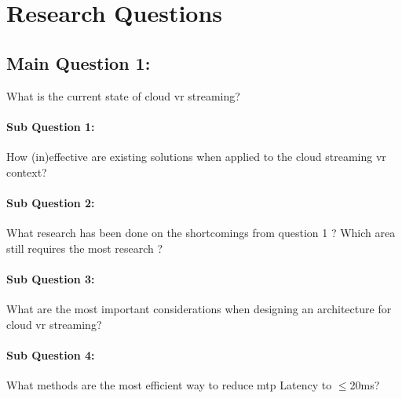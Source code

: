 \section{Research Questions}

\subsection*{Main Question 1:} What is the current state of cloud \acrfull{vr} streaming?
\paragraph{Sub Question 1:} How (in)effective are existing solutions when applied to the cloud streaming \acrshort{vr} context?
\paragraph{Sub Question 2:} What research has been done on the shortcomings from question 1 ? Which area still requires the most research ?
\paragraph{Sub Question 3:} What are the most important considerations when designing an architecture for cloud \acrshort{vr} streaming?
\paragraph{Sub Question 4:} What methods are the most efficient way to reduce \acrfull{mtp} Latency to $\leq$20\acrshort{ms}?
